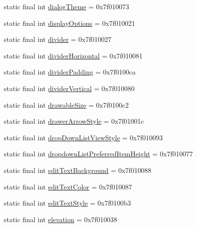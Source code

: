 \begin{CompactItemize}
static final int \hyperlink{classandroid_1_1support_1_1v7_1_1recyclerview_1_1_r_1_1attr_dd7453cd22d8945f17812a8cf3ff4993}{dialogTheme} = 0x7f010073
\item 
static final int \hyperlink{classandroid_1_1support_1_1v7_1_1recyclerview_1_1_r_1_1attr_b5613b03c87764a5d5baeb0b9ea02e69}{displayOptions} = 0x7f010021
\item 
static final int \hyperlink{classandroid_1_1support_1_1v7_1_1recyclerview_1_1_r_1_1attr_d19aef516697bad6154811774e704939}{divider} = 0x7f010027
\item 
static final int \hyperlink{classandroid_1_1support_1_1v7_1_1recyclerview_1_1_r_1_1attr_368a2df762352229054301f3b88e13ff}{dividerHorizontal} = 0x7f010081
\item 
static final int \hyperlink{classandroid_1_1support_1_1v7_1_1recyclerview_1_1_r_1_1attr_adf62704ce6d04a38309f814f9e65934}{dividerPadding} = 0x7f0100ca
\item 
static final int \hyperlink{classandroid_1_1support_1_1v7_1_1recyclerview_1_1_r_1_1attr_692e99bff6f06412714153e6247b8ccc}{dividerVertical} = 0x7f010080
\item 
static final int \hyperlink{classandroid_1_1support_1_1v7_1_1recyclerview_1_1_r_1_1attr_f03de5cd04dcc02ee4e0bde324425bdc}{drawableSize} = 0x7f0100c2
\item 
static final int \hyperlink{classandroid_1_1support_1_1v7_1_1recyclerview_1_1_r_1_1attr_51a4f298987324bc36fb8381aebc1f95}{drawerArrowStyle} = 0x7f01001c
\item 
static final int \hyperlink{classandroid_1_1support_1_1v7_1_1recyclerview_1_1_r_1_1attr_6b72a3717436585fb0601fd475944674}{dropDownListViewStyle} = 0x7f010093
\item 
static final int \hyperlink{classandroid_1_1support_1_1v7_1_1recyclerview_1_1_r_1_1attr_266d6860d086a029e07de104e580c063}{dropdownListPreferredItemHeight} = 0x7f010077
\item 
static final int \hyperlink{classandroid_1_1support_1_1v7_1_1recyclerview_1_1_r_1_1attr_42d9326183b645a45ffb095305f86c23}{editTextBackground} = 0x7f010088
\item 
static final int \hyperlink{classandroid_1_1support_1_1v7_1_1recyclerview_1_1_r_1_1attr_9a251d7cfd049782b491a3a19467e742}{editTextColor} = 0x7f010087
\item 
static final int \hyperlink{classandroid_1_1support_1_1v7_1_1recyclerview_1_1_r_1_1attr_ceea3f714b272c68e095ece5b5b44694}{editTextStyle} = 0x7f0100b3
\item 
static final int \hyperlink{classandroid_1_1support_1_1v7_1_1recyclerview_1_1_r_1_1attr_26958e40fe347c58f2e51064e214e3ec}{elevation} = 0x7f010038

\end{CompactItemize}

